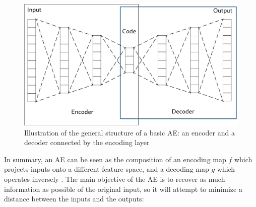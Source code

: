 \begin{figure}[ht]
    \centering
    \includegraphics[width=\linewidth]{autoencoder.png}
    \caption[Illustration of the general structure of a basic AE.]{Illustration of the general structure of a basic AE: an encoder and a decoder connected by the encoding layer}
    \label{fig:ae}
\end{figure}

\begin{table}[ht]\centering
    \caption{}
\end{table}

In summary, an AE can be seen as the composition of an encoding map $f$ which projects inputs onto a different feature space, and a decoding map $g$ which operates inversely . The main objective of the AE is to recover as much information as possible of the original input, so it will attempt to minimize a distance between the inputs and the outputs:

